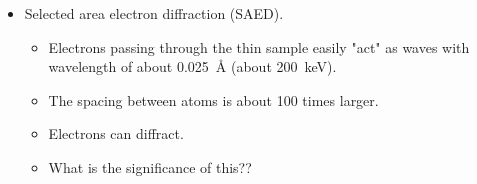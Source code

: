 \documentclass[../notes.tex]{subfiles}
\begin{document}
\begin{itemize}
\begin{figure}[h!]
\begin{subfigure}[b]{0.3\linewidth}
            \centering
            \texttt{[image: BrightDarkMicrographb.png]}
            \caption{Dark field.}
            \label{fig:BrightDarkMicrographb}
        \end{subfigure}
        \caption{Bright field and dark field TEM micrographs.}
        \label{fig:BrightDarkMicrograph}
    \end{figure}
    \begin{itemize}
        \item Can be used to study crystal lattices, crystal defects, stacking faults, dislocations, and particle/grain sizes.
        \item Basic observations.
        \begin{itemize}
            \item Bright: Background is light.
            \item Dark: Background is black.
        \end{itemize}
        \item Specialties of each.
        \begin{itemize}
            \item Bright: Conventional and sufficient for most applications.
            \begin{itemize}
                \item Allows you to more easily see what's there and what's going on.
            \end{itemize}
            \item Dark: Highlights specific structures.
            \begin{itemize}
                \item For example, crystalline domains in an amorphous material appear much more clearly in a dark field.
            \end{itemize}
        \end{itemize}
    \end{itemize}
    \item Selected area electron diffraction (SAED).
    \begin{itemize}
        \item Electrons passing through the thin sample easily "act" as waves with wavelength of about \SI{0.025}{\angstrom} (about \SI{200}{\kilo\electronvolt}).
        \item The spacing between atoms is about 100 times larger.
        \item Electrons can diffract.
        \item What is the significance of this??

\end{itemize}
\end{itemize}
\end{document}
